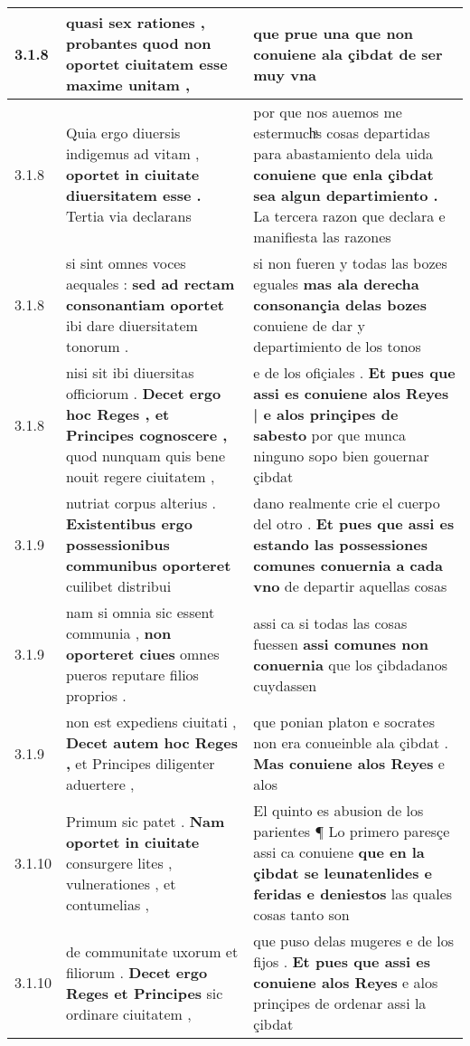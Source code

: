 \begin{tabular}{|p{1cm}|p{6.5cm}|p{6.5cm}|}
3.1.8 & quasi sex rationes , \textbf{ probantes quod non oportet ciuitatem } esse maxime unitam , & que prue una \textbf{ que non conuiene ala çibdat } de ser muy vna \\\hline
3.1.8 & Quia ergo diuersis indigemus ad vitam , \textbf{ oportet in ciuitate diuersitatem esse . } Tertia via declarans & por que nos auemos me estermuchͣs cosas departidas para abastamiento dela uida \textbf{ conuiene que enla çibdat sea algun departimiento . } La tercera razon que declara e manifiesta las razones \\\hline
3.1.8 & si sint omnes voces aequales : \textbf{ sed ad rectam consonantiam oportet } ibi dare diuersitatem tonorum . & si non fueren y todas las bozes eguales \textbf{ mas ala derecha consonançia delas bozes } conuiene de dar y departimiento de los tonos \\\hline
3.1.8 & nisi sit ibi diuersitas officiorum . \textbf{ Decet ergo hoc Reges , et Principes cognoscere , } quod nunquam quis bene nouit regere ciuitatem , & e de los ofiçiales . \textbf{ Et pues que assi es conuiene alos Reyes | e alos prinçipes de sabesto } por que munca ninguno sopo bien gouernar çibdat \\\hline
3.1.9 & nutriat corpus alterius . \textbf{ Existentibus ergo possessionibus communibus oporteret } cuilibet distribui & dano realmente crie el cuerpo del otro . \textbf{ Et pues que assi es estando las possessiones comunes conuernia a cada vno } de departir aquellas cosas \\\hline
3.1.9 & nam si omnia sic essent communia , \textbf{ non oporteret ciues } omnes pueros reputare filios proprios . & assi ca si todas las cosas fuessen \textbf{ assi comunes non conuernia } que los çibdadanos cuydassen \\\hline
3.1.9 & non est expediens ciuitati , \textbf{ Decet autem hoc Reges , } et Principes diligenter aduertere , & que ponian platon e socrates non era conueinble ala çibdat . \textbf{ Mas conuiene alos Reyes } e alos \\\hline
3.1.10 & Primum sic patet . \textbf{ Nam oportet in ciuitate } consurgere lites , vulnerationes , et contumelias , & El quinto es abusion de los parientes ¶ Lo primero paresçe assi ca conuiene \textbf{ que en la çibdat se leunatenlides e feridas e deniestos } las quales cosas tanto son \\\hline
3.1.10 & de communitate uxorum et filiorum . \textbf{ Decet ergo Reges et Principes } sic ordinare ciuitatem , & que puso delas mugeres e de los fijos . \textbf{ Et pues que assi es conuiene alos Reyes } e alos prinçipes de ordenar assi la çibdat \\\hline

\end{tabular}

